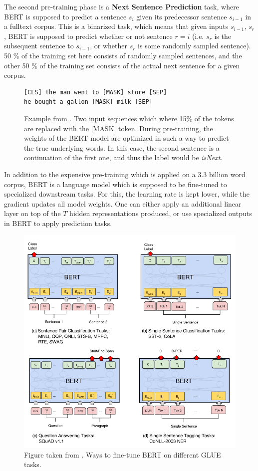 \documentclass[a4paper,12pt,twoside,openright]{report}
\begin{document}
The second pre-training phase is a \textbf{Next Sentence Prediction} task, where BERT is supposed to predict a sentence $s_i$ given its predecessor sentence $s_{i-1}$ in a fulltext corpus.
This is a binarized task, which means that given inputs $s_{i-1}$, $s_r$, BERT is supposed to predict whether or not sentence $r = i$ (i.e. $s_r$ is the subsequent sentence to $s_{i-1}$, or whether $s_r$ is some randomly sampled sentence).
50 \% of the training set here consists of randomly sampled sentences, and the other 50 \% of the training set consists of the actual next sentence for a given corpus.

\begin{figure}[H]
\begin{verbatim}
[CLS] the man went to [MASK] store [SEP]
he bought a gallon [MASK] milk [SEP]
\end{verbatim}
\caption{Example from \cite{devlin18}. 
Two input sequences which where 15\% of the tokens are replaced with the [MASK] token. 
During pre-training, the weights of the BERT model are optimized in such a way to predict the true underlying words.
In this case, the second sentence is a continuation of the first one, and thus the label would be \textit{isNext}.
}
\end{figure}

In addition to the expensive pre-training which is applied on a 3.3 billion word corpus, BERT is a language model which is supposed to be fine-tuned to specialized downstream tasks.
For this, the learning rate is kept lower, while the gradient updates all model weights.
One can either apply an additional linear layer on top of the $T$ hidden representations produced, or use specialized outputs in BERT to apply prediction tasks.

\begin{figure}[h]
	\center
  \includegraphics[width=0.8\linewidth]{./assets/background/BERT_GLUE_finetune.png}
  \caption{Figure taken from \cite{devlin18}. Ways to fine-tune BERT on different GLUE tasks.}
  \label{fig:cbow_skipgram}
\end{figure}
\end{document}
